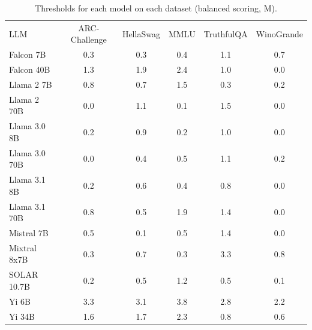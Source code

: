 \begin{table}[h]
\caption{Thresholds for each model on each dataset (balanced scoring, M). }
\label{tab:thresholds_logit_margin_k20_w1}
\centering
\begin{tabular}{l S[table-format=3.1] S[table-format=3.1] S[table-format=3.1] S[table-format=3.1] S[table-format=3.1]}
\toprule
LLM & ARC-Challenge & HellaSwag & MMLU & TruthfulQA & WinoGrande \\ 
\cmidrule(lr){1-1} \cmidrule(lr){2-2} \cmidrule(lr){3-3} \cmidrule(lr){4-4} \cmidrule(lr){5-5} \cmidrule(lr){6-6}
Falcon 7B & 0.3 & 0.3 & 0.4 & 1.1 & 0.7\\
Falcon 40B & 1.3 & 1.9 & 2.4 & 1.0 & 0.0\\
Llama 2 7B & 0.8 & 0.7 & 1.5 & 0.3 & 0.2\\
Llama 2 70B & 0.0 & 1.1 & 0.1 & 1.5 & 0.0\\
Llama 3.0 8B & 0.2 & 0.9 & 0.2 & 1.0 & 0.0\\
Llama 3.0 70B & 0.0 & 0.4 & 0.5 & 1.1 & 0.2\\
Llama 3.1 8B & 0.2 & 0.6 & 0.4 & 0.8 & 0.0\\
Llama 3.1 70B & 0.8 & 0.5 & 1.9 & 1.4 & 0.0\\
Mistral 7B & 0.5 & 0.1 & 0.5 & 1.4 & 0.0\\
Mixtral 8x7B & 0.3 & 0.7 & 0.3 & 3.3 & 0.8\\
SOLAR 10.7B & 0.2 & 0.5 & 1.2 & 0.5 & 0.1\\
Yi 6B & 3.3 & 3.1 & 3.8 & 2.8 & 2.2\\
Yi 34B & 1.6 & 1.7 & 2.3 & 0.8 & 0.6\\
\bottomrule
\end{tabular}
\end{table}

